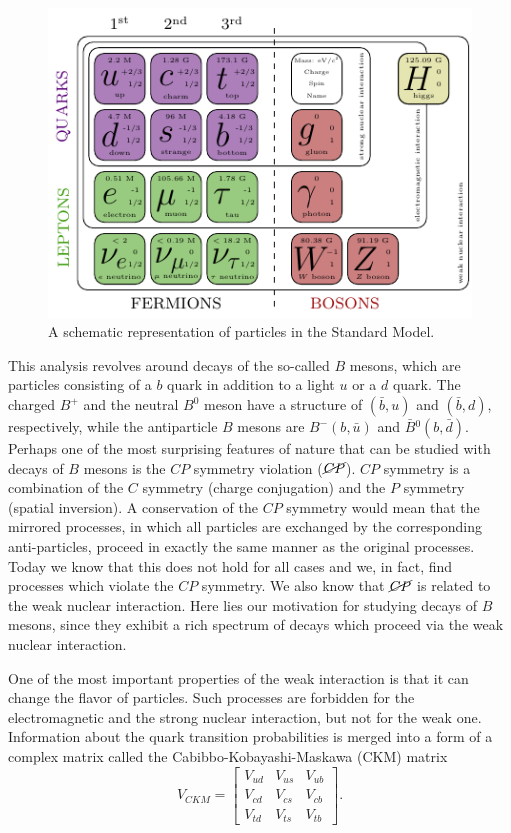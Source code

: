 \begin{figure}[H]
	\centering
	\includegraphics[scale=1.6]{texfig/SM}
	\captionsetup{width=.8\linewidth}
	\caption{A schematic representation of particles in the Standard Model.}
	\label{fig:sm}
\end{figure}

This analysis revolves around decays of the so-called $B$ mesons, which are particles consisting of a $b$ quark in addition to a light $u$ or a $d$ quark. The charged $B^+$ and the neutral $B^0$ meson have a structure of $(\bar b, u)$ and $(\bar b, d)$, respectively, while the antiparticle $B$ mesons are $B^-(b, \bar u)$ and $\bar B{}^0(b, \bar d)$.  Perhaps one of the most surprising features of nature that can be studied with decays of $B$ mesons is the $CP$ symmetry violation ($\cancel{CP}$). $CP$ symmetry is a combination of the $C$ symmetry (charge conjugation) and the $P$ symmetry (spatial inversion). A conservation of the $CP$ symmetry would mean that the mirrored processes, in which all particles are exchanged by the corresponding anti-particles, proceed in exactly the same manner as the original processes. Today we know that this does not hold for all cases and we, in fact, find processes which violate the $CP$ symmetry. We also know that $\cancel{CP}$ is related to the weak nuclear interaction. Here lies our motivation for studying decays of $B$ mesons, since they exhibit a rich spectrum of decays which proceed via the weak nuclear interaction.

One of the most important properties of the weak interaction is that it can change the flavor of particles. Such processes are forbidden for the electromagnetic and the strong nuclear interaction, but not for the weak one. Information about the quark transition probabilities is merged into a form of a complex matrix called the Cabibbo-Kobayashi-Maskawa (CKM) matrix \cite{cabibbo1963unitary,kobayashi1973cp}
\begin{equation}
V_{CKM} = \begin{bmatrix}
V_{ud} & V_{us} & V_{ub}\\
V_{cd} & V_{cs} & V_{cb}\\
V_{td} & V_{ts} & V_{tb}
\end{bmatrix}.
\end{equation}

